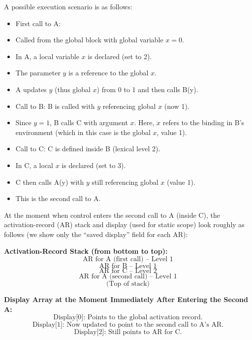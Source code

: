\documentclass{article}
\begin{document}
A possible execution scenario is as follows:

\begin{itemize}
    \item First call to A:
    \item Called from the global block with global variable \(x = 0\).
    \item In A, a local variable \(x\) is declared (set to 2).
    \item The parameter \(y\) is a reference to the global \(x\).
    \item A updates \(y\) (thus global \(x\)) from 0 to 1 and then calls B(y).
    \item Call to B: B is called with \(y\) referencing global \(x\) (now 1).
    \item Since \(y = 1\), B calls C with argument \(x\). Here, \(x\) refers to the binding in B’s environment (which in this case is the global \(x\), value 1).
    \item Call to C: C is defined inside B (lexical level 2).
    \item In C, a local \(x\) is declared (set to 3).
    \item C then calls A(y) with \(y\) still referencing global \(x\) (value 1).
    \item This is the second call to A.
\end{itemize}

At the moment when control enters the second call to A (inside C), the activation-record (AR) stack and display (used for static scope) look roughly as follows (we show only the ``saved display'' field for each AR):

\textbf{Activation-Record Stack (from bottom to top):}
\[
\text{AR for A (first call) – Level 1}
\]
\[
\text{AR for B – Level 1}
\]
\[
\text{AR for C – Level 2}
\]
\[
\text{AR for A (second call) – Level 1}
\]
\[
\text{(Top of stack)}
\]

\textbf{Display Array at the Moment Immediately After Entering the Second A:}
\[
\text{Display[0]: Points to the global activation record.}
\]
\[
\text{Display[1]: Now updated to point to the second call to A’s AR.}
\]
\[
\text{Display[2]: Still points to AR for C.}
\]
\end{document}
